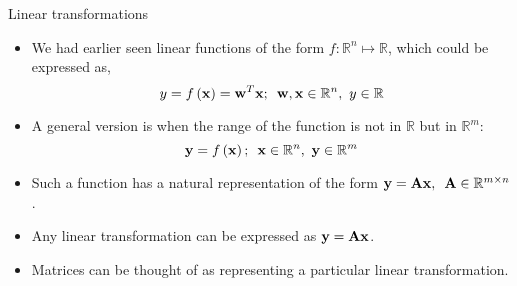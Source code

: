 \documentclass[aspectratio=169]{beamer}
\def\mf{\ensuremath\mathbf}
\begin{document}
\begin{frame}[t]{Linear transformations}
\begin{itemize}
    \item We had earlier seen linear functions of the form $f: \mathbb{R}^n \mapsto \mathbb{R}$, which could be expressed as,
    $$y = f\left(\mf{x}\right) = \mf{w}^T\mf{x}; \,\,\, \mf{w}, \mf{x} \in \mathbb{R}^n, \,\, y \in \mathbb{R}$$

    \item A general version is when the range of the function is not in $\mathbb{R}$ but in $\mathbb{R}^m$:
    $$\mf{y} = f\left(\mf{x}\right); \,\,\, \mf{x} \in \mathbb{R}^n, \,\, \mf{y} \in \mathbb{R}^m$$

    \item Such a function has a natural representation of the form $\mf{y} = \mf{Ax}, \,\,\, \mf{A} \in \mathbb{R}^{m \times n}$.\\

    \item Any linear transformation can be expressed as $\mf{y} = \mf{Ax}$.

    \item Matrices can be thought of as representing a particular linear transformation.
\end{itemize}
\end{frame}
\end{document}
